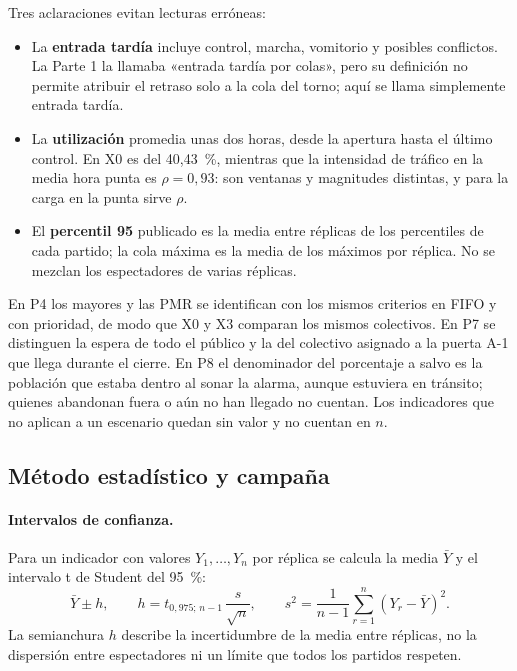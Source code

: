 Tres aclaraciones evitan lecturas erróneas:

\begin{itemize}
  \item La \textbf{entrada tardía} incluye control, marcha, vomitorio y posibles
    conflictos. La Parte 1 la llamaba «entrada tardía por colas», pero su
    definición no permite atribuir el retraso solo a la cola del torno; aquí se
    llama simplemente entrada tardía.
  \item La \textbf{utilización} promedia unas dos horas, desde la apertura hasta
    el último control. En X0 es del 40,43~\%, mientras que la intensidad de
    tráfico en la media hora punta es $\rho=0{,}93$: son ventanas y magnitudes
    distintas, y para la carga en la punta sirve $\rho$.
  \item El \textbf{percentil 95} publicado es la media entre réplicas de los
    percentiles de cada partido; la cola máxima es la media de los máximos por
    réplica. No se mezclan los espectadores de varias réplicas.
\end{itemize}

En P4 los mayores y las PMR se identifican con los mismos criterios en FIFO y
con prioridad, de modo que X0 y X3 comparan los mismos colectivos. En P7 se
distinguen la espera de todo el público y la del colectivo asignado a la puerta
A-1 que llega durante el cierre. En P8 el denominador del porcentaje a salvo es
la población que estaba dentro al sonar la alarma, aunque estuviera en tránsito;
quienes abandonan fuera o aún no han llegado no cuentan. Los indicadores que no
aplican a un escenario quedan sin valor y no cuentan en $n$.

\subsection{Método estadístico y campaña}\label{sec:campana}

\paragraph{Intervalos de confianza.} Para un indicador con valores
$Y_1,\dots,Y_n$ por réplica se calcula la media $\bar Y$ y el intervalo
t de Student del 95~\%:
\[
  \bar Y \pm h, \qquad h = t_{0{,}975;\,n-1}\,\frac{s}{\sqrt n}, \qquad
  s^2 = \frac{1}{n-1}\sum_{r=1}^n (Y_r-\bar Y)^2 .
\]
La semianchura $h$ describe la incertidumbre de la media entre réplicas, no la
dispersión entre espectadores ni un límite que todos los partidos respeten.

